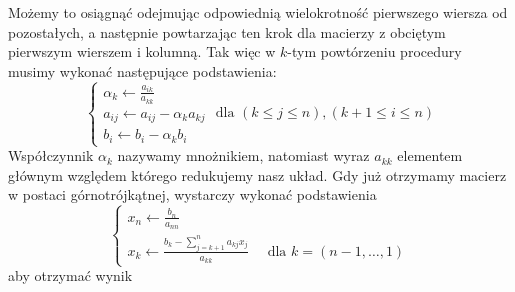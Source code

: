\documentclass[11pt,wide]{mwart}
\begin{document}
Możemy to osiągnąć odejmując odpowiednią wielokrotność pierwszego wiersza od pozostałych, a następnie powtarzając ten krok dla macierzy z obciętym pierwszym wierszem i kolumną. Tak więc w $ k $-tym powtórzeniu procedury musimy wykonać następujące podstawienia:
\begin{equation}
\begin{cases}
	\alpha_k \leftarrow \frac{a_{ik}}{a_{kk}} \\
	a_{ij} \leftarrow a_{ij} - \alpha_k a_{kj} \\
	b_{i} \leftarrow b_{i} - \alpha_k b_{i}
\end{cases} \text{ dla }(k \leq j \leq n), (k + 1 \leq i \leq n)
\end{equation}
Współczynnik $ \alpha_k $ nazywamy mnożnikiem, natomiast wyraz $ a_{kk} $ elementem głównym względem którego redukujemy nasz układ. Gdy już otrzymamy macierz w postaci górnotrójkątnej, wystarczy wykonać podstawienia 
$$ 
\begin{cases}
	x_n \leftarrow \frac{b_n}{a_{nn}} \\
	x_k \leftarrow \frac{b_k - \sum_{j = k+1}^{n} a_{kj}x_{j}}{a_{kk}} \quad \text{ dla } k = (n-1, \ldots ,  1)
\end{cases}
$$
aby otrzymać wynik
\end{document}
